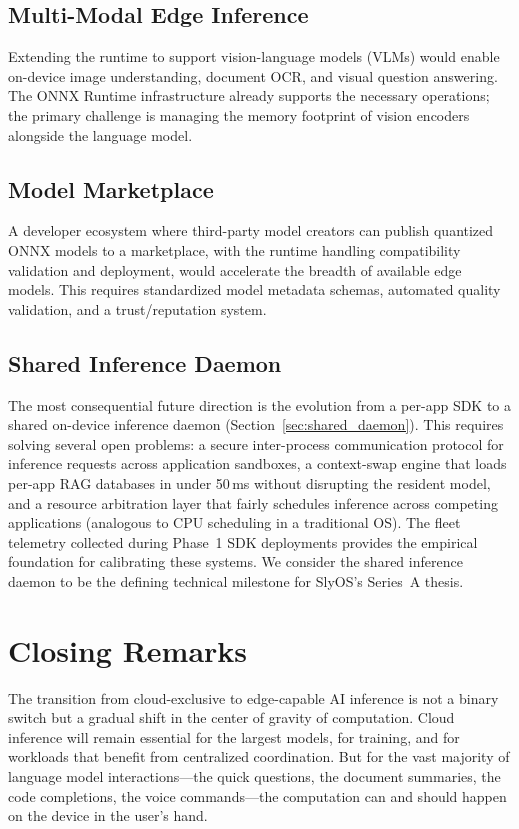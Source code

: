 \documentclass[12pt, letterpaper, twoside]{report}
\begin{document}
\subsection{Multi-Modal Edge Inference}
Extending the runtime to support vision-language models (VLMs) would enable on-device image understanding, document OCR, and visual question answering. The ONNX Runtime infrastructure already supports the necessary operations; the primary challenge is managing the memory footprint of vision encoders alongside the language model.

\subsection{Model Marketplace}
A developer ecosystem where third-party model creators can publish quantized ONNX models to a marketplace, with the runtime handling compatibility validation and deployment, would accelerate the breadth of available edge models. This requires standardized model metadata schemas, automated quality validation, and a trust/reputation system.

\subsection{Shared Inference Daemon}
The most consequential future direction is the evolution from a per-app SDK to a shared on-device inference daemon (Section~\ref{sec:shared_daemon}). This requires solving several open problems: a secure inter-process communication protocol for inference requests across application sandboxes, a context-swap engine that loads per-app RAG databases in under 50\,ms without disrupting the resident model, and a resource arbitration layer that fairly schedules inference across competing applications (analogous to CPU scheduling in a traditional OS). The fleet telemetry collected during Phase~1 SDK deployments provides the empirical foundation for calibrating these systems. We consider the shared inference daemon to be the defining technical milestone for SlyOS's Series~A thesis.

\section{Closing Remarks}
\label{sec:closing}

The transition from cloud-exclusive to edge-capable AI inference is not a binary switch but a gradual shift in the center of gravity of computation. Cloud inference will remain essential for the largest models, for training, and for workloads that benefit from centralized coordination. But for the vast majority of language model interactions---the quick questions, the document summaries, the code completions, the voice commands---the computation can and should happen on the device in the user's hand.
\end{document}
